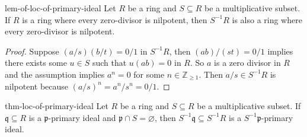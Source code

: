 \documentclass[a4paper,10pt]{article}
\theoremstyle{definition}
\renewcommand\geq{\geqslant}
\begin{document}
\begin{lemma}{}{lem-of-loc-of-primary-ideal}
Let $R$ be a ring and $S\subseteq R$ be a multiplicative subset.
If $R$ is a ring where every zero-divisor is nilpotent,
then $S^{-1}R$ is also a ring where every zero-divisor is nilpotent.
\end{lemma}
\begin{proof}
Suppose $(a/s)(b/t)=0/1$ in $S^{-1}R$, then $(ab)/(st)=0/1$ 
implies there exists some $u\in S$ such that $u(ab)=0$ in $R$.
So $a$ is a zero divisor in $R$ and 
the assumption implies $a^n=0$ for some $n\in\mathbb{Z}_{\geq1}$.
Then $a/s\in S^{-1}R$ is nilpotent because $(a/s)^n=a^n/s^n=0/1$.
\end{proof}

\begin{theorem}{}{thm-loc-of-primary-ideal}
Let $R$ be a ring and $S\subseteq R$ be a multiplicative subset.
If $\mathfrak{q}\subseteq R$ is a $\mathfrak{p}$-primary ideal 
and $\mathfrak{p}\cap S=\varnothing$,
then $S^{-1}\mathfrak{q}\subseteq S^{-1}R$ 
is a $S^{-1}\mathfrak{p}$-primary ideal.
\end{theorem}
\end{document}
